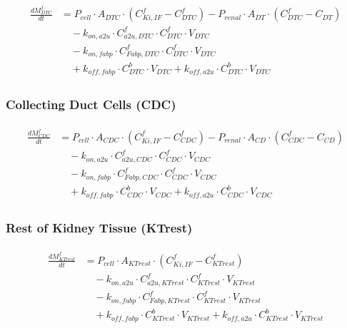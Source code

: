 \documentclass[preprint,12pt,authoryear]{elsarticle}
\begin{document}
\begin{align}
\begin{aligned}
\frac{dM_{DTC}^f}{dt} &= P_{cell} \cdot A_{DTC}  \cdot (C_{Ki,IF}^f - C_{DTC}^f)
- P_{renal} \cdot A_{DT}  \cdot (C_{DTC}^f - C_{DT}) \\
& \quad - k_{on,a2u} \cdot C_{a2u,DTC}^f \cdot C_{DTC}^f \cdot V_{DTC}
\\
& \quad -k_{on,fabp} \cdot C_{Fabp,DTC}^f \cdot C_{DTC}^f \cdot V_{DTC}  \\
& \quad +k_{off,fabp} \cdot C_{DTC}^b \cdot V_{DTC}
+ k_{off,a2u} \cdot C_{DTC}^b \cdot V_{DTC}
\end{aligned}
\label{eq:PFOA_distal_tubule_cells}
\end{align}

\subsubsection{Collecting Duct Cells (CDC)}

\begin{align}
\begin{aligned}
\frac{dM_{CDC}^f}{dt} &= P_{cell} \cdot A_{CDC}  \cdot (C_{Ki,IF}^f - C_{CDC}^f)
- P_{renal} \cdot A_{CD}  \cdot (C_{CDC}^f - C_{CD}) \\
& \quad -k_{on,a2u} \cdot C_{a2u,CDC}^f \cdot C_{CDC}^f \cdot V_{CDC}\\
& \quad - k_{on,fabp} \cdot C_{Fabp,CDC}^f \cdot C_{CDC}^f \cdot V_{CDC}  \\
& \quad + k_{off,fabp} \cdot C_{CDC}^b \cdot V_{CDC}
+ k_{off,a2u} \cdot C_{CDC}^b \cdot V_{CDC} 
\end{aligned}
\label{eq:PFOA_collecting_duct_cells}
\end{align}

\subsubsection{Rest of Kidney Tissue (KTrest) }

\begin{align}
\begin{aligned}
\frac{dM_{KTrest}^f}{dt} &= P_{cell} \cdot A_{KTrest}  \cdot (C_{Ki,IF}^f - C_{KTrest}^f) \\
& \quad - k_{on,a2u} \cdot C_{a2u,KTrest}^f \cdot C_{KTrest}^f \cdot V_{KTrest}\\
& \quad - k_{on,fabp} \cdot C_{Fabp,KTrest}^f \cdot C_{KTrest}^f \cdot V_{KTrest}  \\
& \quad +  k_{off,fabp} \cdot C_{KTrest}^b \cdot V_{KTrest}
+ k_{off,a2u} \cdot C_{KTrest}^b \cdot V_{KTrest} 
\end{aligned}
\label{eq:PFOA_rest_of_kidney_tissue}
\end{align}
\end{document}
